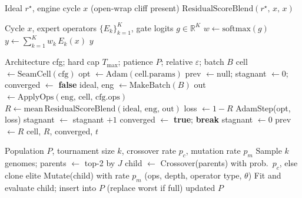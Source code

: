 \begin{algorithm}[H]
\caption{No-bake (passthrough) control}
\label{alg:no-bake}
\begin{algorithmic}[1]
\Require Ideal $r^{\star}$, engine cycle $x$ (open-wrap cliff present)
\State \Return $\mathrm{ResidualScoreBlend}(r^{\star},\,x,\,x)$ 
\end{algorithmic}
\end{algorithm}

\begin{algorithm}[H]
\caption{MoE soft gating over bake experts}
\label{alg:moe}
\begin{algorithmic}[1]
\Require Cycle $x$, expert operators $\{E_k\}_{k=1}^{K}$, gate logits $g\in\mathbb{R}^{K}$
\State $w \gets \mathrm{softmax}(g)$
\State $y \gets \sum_{k=1}^{K} w_k\, E_k(x)$
\State \Return $y$
\end{algorithmic}
\end{algorithm}

\begin{algorithm}[H]
\caption{FitCell (inner loop; converge protocol)}
\label{alg:fit}
\begin{algorithmic}[1]
\Require Architecture cfg; hard cap $T_{\max}$; patience $P$; relative $\varepsilon$; batch $B$
\State cell $\gets \mathrm{SeamCell}(\mathrm{cfg})$
\State opt $\gets \mathrm{Adam}(\mathrm{cell.params})$
\State prev $\gets \mathrm{null}$; stagnant $\gets 0$; converged $\gets$ \textbf{false}
  \State ideal, eng $\gets \mathrm{MakeBatch}(B)$
  \State out $\gets \mathrm{ApplyOps}(\mathrm{eng},\,\mathrm{cell},\,\mathrm{cfg.ops})$
  \State $R \gets \mathrm{mean}\,\mathrm{ResidualScoreBlend}(\mathrm{ideal},\,\mathrm{eng},\,\mathrm{out})$
  \State loss $\gets 1-R$
    \State AdamStep(opt, loss)
  \EndIf
    \State stagnant $\gets$ stagnant $+1$
      \State converged $\gets$ \textbf{true}; \textbf{break}
    \EndIf
  \Else
    \State stagnant $\gets 0$
  \EndIf
  \State prev $\gets R$
\EndFor
\State \Return cell, $R$, converged, $t$
\end{algorithmic}
\end{algorithm}

\begin{algorithm}[H]
\caption{GA tournament step}
\label{alg:ga}
\begin{algorithmic}[1]
\Require Population $P$, tournament size $k$, crossover rate $p_c$, mutation rate $p_m$
\State Sample $k$ genomes; parents $\gets$ top-2 by $J$
\State child $\gets$ Crossover(parents) with prob.\ $p_c$, else clone elite
\State Mutate(child) with rate $p_m$ (ops, depth, operator type, $\theta$)
\State Fit and evaluate child; insert into $P$ (replace worst if full)
\State \Return updated $P$
\end{algorithmic}
\end{algorithm}


